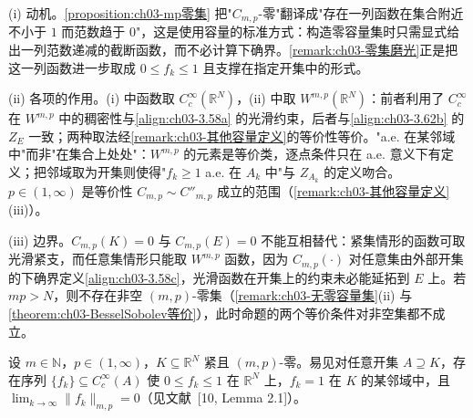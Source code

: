 \documentclass[../../main.tex]{subfiles}%
\begin{document}
\begin{remark}\label{remark:ch03-mp零集动机}
(i) 动机。\cref{proposition:ch03-mp零集} 把"$C_{m,p}$-零"翻译成"存在一列函数在集合附近不小于 $1$ 而范数趋于 $0$"，这是使用容量的标准方式：构造零容量集时只需显式给出一列范数递减的截断函数，而不必计算下确界。\cref{remark:ch03-零集磨光}正是把这一列函数进一步取成 $0\leqslant f_k\leqslant1$ 且支撑在指定开集中的形式。

(ii) 各项的作用。(i) 中函数取 $C^\infty_c(\mathbb{R}^N)$，(ii) 中取 $W^{m,p}(\mathbb{R}^N)$：前者利用了 $C^\infty_c$ 在 $W^{m,p}$ 中的稠密性与\eqref{align:ch03-3.58a} 的光滑约束，后者与\eqref{align:ch03-3.62b} 的 $Z_E$ 一致；两种取法经\cref{remark:ch03-其他容量定义}的等价性等价。"a.e. 在某邻域中"而非"在集合上处处"：$W^{m,p}$ 的元素是等价类，逐点条件只在 a.e. 意义下有定义；把邻域取为开集则使得"$f_k\geqslant1$ a.e. 在 $A_k$ 中"与 $Z_{A_k}$ 的定义吻合。$p\in(1,\infty)$ 是等价性 $C_{m,p}\sim C''_{m,p}$ 成立的范围（\cref{remark:ch03-其他容量定义}(iii)）。

(iii) 边界。$C_{m,p}(K)=0$ 与 $C_{m,p}(E)=0$ 不能互相替代：紧集情形的函数可取光滑紧支，而任意集情形只能取 $W^{m,p}$ 函数，因为 $C_{m,p}(\cdot)$ 对任意集由外部开集的下确界定义\eqref{align:ch03-3.58c}，光滑函数在开集上的约束未必能延拓到 $E$ 上。若 $mp>N$，则不存在非空 $(m,p)$-零集（\cref{remark:ch03-无零容量集}(ii) 与\cref{theorem:ch03-BesselSobolev等价}），此时命题的两个等价条件对非空集都不成立。
\end{remark}

\begin{remark}\label{remark:ch03-零集磨光}\label{remark:ch03-磨光注}
设 $m\in\mathbb{N}$，$p\in(1,\infty)$，$K\subseteq\mathbb{R}^N$ 紧且 $(m,p)$-零。易见对任意开集 $A\supseteq K$，存在序列 $\{f_k\}\subseteq C^\infty_c(A)$ 使 $0\leqslant f_k\leqslant1$ 在 $\mathbb{R}^N$ 上，$f_k=1$ 在 $K$ 的某邻域中，且 $\lim_{k\to\infty}\|f_k\|_{m,p}=0$（见文献~[10, Lemma 2.1]）。
\end{remark}
\end{document}
